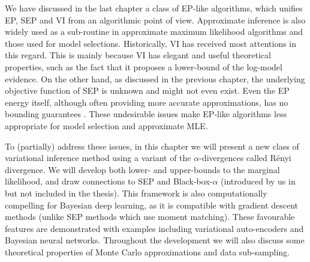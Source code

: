 
We have discussed in the last chapter a class of EP-like algorithms, which unifies EP, SEP and VI from an algorithmic point of view. Approximate inference is also widely used as a sub-routine in approximate maximum likelihood algorithms and those used for model selections. Historically, VI has received most attentions in this regard. This is mainly because VI has elegant and useful theoretical properties, such as the fact that it proposes a lower-bound of the log-model evidence. 
%
On the other hand, as discussed in the previous chapter, the underlying objective function of SEP is unknown and might not even exist. Even the EP energy itself, although often providing more accurate approximations, has no bounding guarantees \citep{cunningham:gaussianEP2011}. These undesirable issues make EP-like algorithms less appropriate for model selection and approximate MLE. 

To (partially) address these issues, in this chapter we will present a new class of variational inference method using a variant of the $\alpha$-divergences called R{\'e}nyi divergence. We will develop both lower- and upper-bounds to the marginal likelihood, and draw connections to SEP and Black-box-$\alpha$ (introduced by us in \cite{hernandez-lobato:bbalpha2016} but not included in the thesis). This framework is also computationally compelling for Bayesian deep learning, as it is compatible with gradient descent methods (unlike SEP methods which use moment matching). These favourable features are demonstrated with examples including variational auto-encoders and Bayesian neural networks. Throughout the development we will also discuss some theoretical properties of Monte Carlo approximations and data sub-sampling.